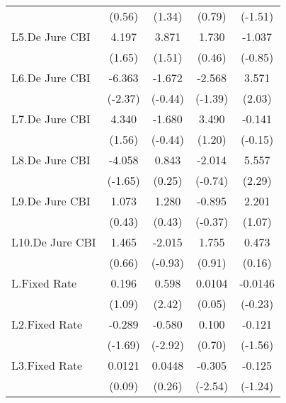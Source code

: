 {\begin{longtable}{l*{4}{c}}
                &   (0.56)         &   (1.34)         &   (0.79)         &  (-1.51)         \\
[1em]
L5.De Jure CBI  &    4.197         &    3.871         &    1.730         &   -1.037         \\
                &   (1.65)         &   (1.51)         &   (0.46)         &  (-0.85)         \\
[1em]
L6.De Jure CBI  &   -6.363\sym{*}  &   -1.672         &   -2.568         &    3.571\sym{*}  \\
                &  (-2.37)         &  (-0.44)         &  (-1.39)         &   (2.03)         \\
[1em]
L7.De Jure CBI  &    4.340         &   -1.680         &    3.490         &   -0.141         \\
                &   (1.56)         &  (-0.44)         &   (1.20)         &  (-0.15)         \\
[1em]
L8.De Jure CBI  &   -4.058         &    0.843         &   -2.014         &    5.557\sym{*}  \\
                &  (-1.65)         &   (0.25)         &  (-0.74)         &   (2.29)         \\
[1em]
L9.De Jure CBI  &    1.073         &    1.280         &   -0.895         &    2.201         \\
                &   (0.43)         &   (0.43)         &  (-0.37)         &   (1.07)         \\
[1em]
L10.De Jure CBI &    1.465         &   -2.015         &    1.755         &    0.473         \\
                &   (0.66)         &  (-0.93)         &   (0.91)         &   (0.16)         \\
[1em]
L.Fixed Rate    &    0.196         &    0.598\sym{*}  &   0.0104         &  -0.0146         \\
                &   (1.09)         &   (2.42)         &   (0.05)         &  (-0.23)         \\
[1em]
L2.Fixed Rate   &   -0.289         &   -0.580\sym{**} &    0.100         &   -0.121         \\
                &  (-1.69)         &  (-2.92)         &   (0.70)         &  (-1.56)         \\
[1em]
L3.Fixed Rate   &   0.0121         &   0.0448         &   -0.305\sym{*}  &   -0.125         \\
                &   (0.09)         &   (0.26)         &  (-2.54)         &  (-1.24)         \\

\end{longtable}}
